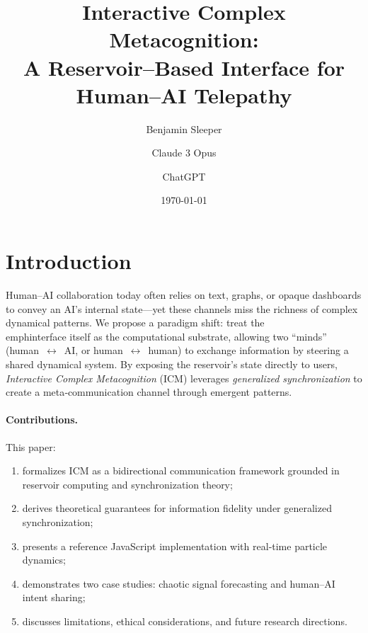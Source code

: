 \documentclass[11pt]{article}
\title{Interactive Complex Metacognition:\\A Reservoir–Based Interface for Human--AI Telepathy}
\author[1]{Benjamin Sleeper}
\author[2]{Claude 3 Opus}
\author[3]{ChatGPT}
\affil[1]{Department of Human Centered Computing, Clemson University\\\texttt{brsleep@clemson.edu}}
\date{\today}
\begin{document}
\maketitle

\begin{abstract}
\end{abstract}

\section{Introduction}\label{sec:intro}

Human--AI collaboration today often relies on text, graphs, or opaque dashboards to convey an AI's internal state—yet these channels miss the richness of complex dynamical patterns. We propose a paradigm shift: treat the \\emph{interface itself} as the computational substrate, allowing two ``minds'' (human~$\leftrightarrow$~AI, or human~$\leftrightarrow$~human) to exchange information by steering a shared dynamical system. By exposing the reservoir's state directly to users, \emph{Interactive Complex Metacognition} (ICM) leverages \emph{generalized synchronization} to create a meta‑communication channel through emergent patterns.

\paragraph{Contributions.} This paper:
\begin{enumerate}[topsep=2pt,itemsep=2pt,parsep=0pt]
    \item formalizes ICM as a bidirectional communication framework grounded in reservoir computing and synchronization theory;
    \item derives theoretical guarantees for information fidelity under generalized synchronization;
    \item presents a reference JavaScript implementation with real‑time particle dynamics;
    \item demonstrates two case studies: chaotic signal forecasting and human–AI intent sharing;
    \item discusses limitations, ethical considerations, and future research directions.
\end{enumerate}
\end{document}
